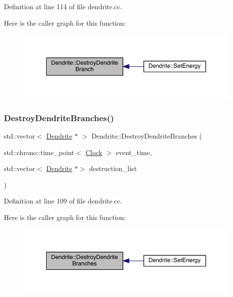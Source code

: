 Definition at line 114 of file dendrite.\+cc.

Here is the caller graph for this function\+:
\nopagebreak
\begin{figure}[H]
\begin{center}
\leavevmode
\includegraphics[width=350pt]{class_dendrite_a87887a43ac38e762255da18eaaee43f5_icgraph}
\end{center}
\end{figure}
\mbox{\label{class_dendrite_a92c08afc374068922e462c9b65cf9157}} 
\subsubsection{\texorpdfstring{Destroy\+Dendrite\+Branches()}{DestroyDendriteBranches()}}
{\footnotesize\ttfamily std\+::vector$<$ \hyperlink{class_dendrite}{Dendrite} $\ast$ $>$ Dendrite\+::\+Destroy\+Dendrite\+Branches (\begin{DoxyParamCaption}\item[{std\+::chrono\+::time\+\_\+point$<$ \hyperlink{universe_8h_a0ef8d951d1ca5ab3cfaf7ab4c7a6fd80}{Clock} $>$}]{event\+\_\+time,  }\item[{std\+::vector$<$ \hyperlink{class_dendrite}{Dendrite} $\ast$$>$}]{destruction\+\_\+list }\end{DoxyParamCaption})}



Definition at line 109 of file dendrite.\+cc.

Here is the caller graph for this function\+:
\nopagebreak
\begin{figure}[H]
\begin{center}
\leavevmode
\includegraphics[width=350pt]{class_dendrite_a92c08afc374068922e462c9b65cf9157_icgraph}
\end{center}
\end{figure}
\mbox{\label{class_dendrite_afa65091d7bbeed3f16a3e71a687fdec3}} 
